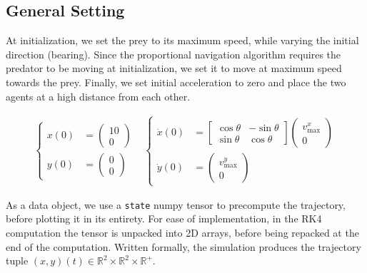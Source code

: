 \documentclass[10pt, twocolumn]{article}
\begin{document}
\subsection{General Setting}
At initialization, we set the prey to its maximum speed, while varying the initial direction (bearing). Since the proportional navigation algorithm requires the predator to be moving at initialization, we set it to move at maximum speed towards the prey. Finally, we set initial acceleration to zero and place the two agents at a high distance from each other.

\[
  \begin{array}{l}
    \left\{
      \begin{aligned}
        x(0) &=
        \begin{pmatrix} 10 \\ 0
        \end{pmatrix} \\
        y(0) &=
        \begin{pmatrix} 0 \\ 0
        \end{pmatrix}
      \end{aligned}
      \right.
    \end{array}
    \begin{array}{l}
      \left\{
        \begin{aligned}
          \dot{x}(0) &=
          \begin{bmatrix}
            \cos\theta & -\sin\theta \\
            \sin\theta & \cos\theta
          \end{bmatrix}
          \begin{pmatrix}
            v^x_{\text{max}} \\
            0
          \end{pmatrix} \\
          \dot{y}(0) &=
          \begin{pmatrix} v^y_{\text{max}} \\ 0
          \end{pmatrix}
        \end{aligned}
        \right.
      \end{array}
    \]

    As a data object, we use a \texttt{state} numpy tensor to precompute the trajectory, before plotting it in its entirety. For ease of implementation, in the RK4 computation the tensor is unpacked into 2D arrays, before being repacked at the end of the computation. Written formally, the simulation produces the trajectory tuple $(x,y)(t)\in \mathbb{R}^2 \times \mathbb{R}^2 \times \mathbb{R}^+$.
\end{document}

